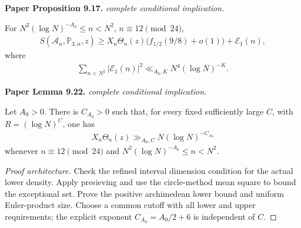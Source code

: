 \begin{lemma}
\label{lower_sieve}
\leanok
\par\medskip\noindent\textbf{Paper Proposition 9.17.} \textit{complete conditional implication.}\par
For $N^2(\log N)^{-A_0}\leq n<N^2$, $n\equiv12\pmod{24}$,
\begin{align}
 S(\mathcal A_n,\mathbb P_{3,n},z)
 \geq X_n\Theta_n(z)\bigl(f_{1/2}(9/8)+o(1)\bigr)
 +\mathcal E_1(n),
\end{align}
where
\begin{align}
\sum_{n<N^2}|\mathcal E_1(n)|^2
\ll_{A_0,K} N^4(\log N)^{-K}.
\end{align}
\par\medskip\noindent\textbf{Paper Lemma 9.22.} \textit{complete conditional implication.}\par
Let \(A_0>0\).  There is \(C_{A_0}>0\) such that, for every fixed
sufficiently large \(C\), with \(R=(\log N)^C\), one has
\begin{align}
 X_n\Theta_n(z)\gg_{A_0,C}
 N(\log N)^{-C_{A_0}}
\end{align}
whenever $n\equiv12\pmod{24}$ and $N^2(\log N)^{-A_0}\leq n<N^2$.
\end{lemma}
\begin{proof}[Proof architecture]
\leanok
Check the refined interval dimension condition for the actual lower density. Apply presieving and use the circle-method mean square to bound the exceptional set. Prove the positive archimedean lower bound and uniform Euler-product size. Choose a common cutoff with all lower and upper requirements; the explicit exponent $C_{A_0}=A_0/2+6$ is independent of $C$.
\end{proof}

